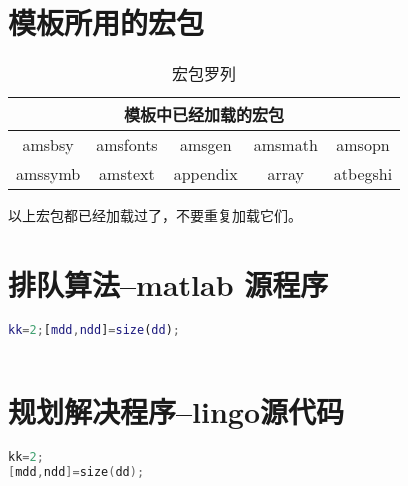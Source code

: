 \documentclass[withoutpreface,bwprint]{cumcmthesis} %
\begin{document}
\newpage
\begin{appendices}
 
\section{模板所用的宏包}
\begin{table}[htbp]
    \centering
    \caption{宏包罗列}
    \begin{tabular}{ccccc}
        \toprule
        \multicolumn{5}{c}{模板中已经加载的宏包} \\
        \midrule
        amsbsy & amsfonts & {amsgen} & {amsmath} & {amsopn} \\
        amssymb & amstext & {appendix} & {array} & {atbegshi} \\
        \bottomrule
    \end{tabular}%
    \label{tab:addlabel}%
\end{table}%
 
以上宏包都已经加载过了，不要重复加载它们。
 
\section{排队算法--matlab 源程序}
 
\begin{lstlisting}[language=matlab]
kk=2;[mdd,ndd]=size(dd);
 
 \end{lstlisting}
 
 \section{规划解决程序--lingo源代码}
 
\begin{lstlisting}[language=c]
kk=2;
[mdd,ndd]=size(dd);
 \end{lstlisting}
\end{appendices}
 
\end{document}
